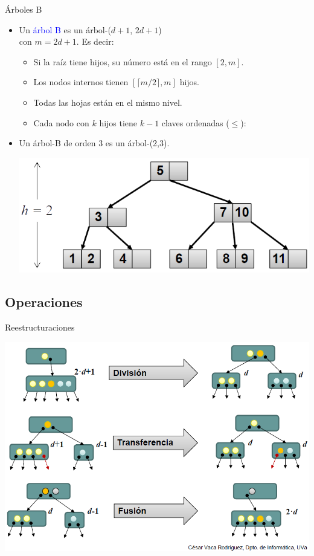 \documentclass[handout]{beamer} %
\newcommand{\blue}[1]{\textcolor{blue}{#1}}
\newcommand{\redb}[1]{{\color{red!70!black}{#1}}}
\begin{document}
\begin{frame}{Árboles B}
    \begin{itemize}
        \item<1-> Un \blue{árbol B} \redb{de orden $m$} es un árbol-($d+1$, $2d+1$)\\con $m=2d+1$. Es decir:
        \begin{itemize}
            \item Si la raíz tiene hijos, su número está en el rango $[2,m]$.
            \item Los nodos internos tienen $[\lceil m/2\rceil,m]$ hijos.
            \item Todas las hojas están en el mismo nivel.
            \item Cada nodo con $k$ hijos tiene $k-1$ claves ordenadas ($\leq$):
        \end{itemize}
        \item<2-> Un árbol-B de orden 3 es un árbol-(2,3).
        \begin{center}
            \includegraphics[width=.6\textwidth]{./image/cap3/(23)-tree}
        \end{center}
    \end{itemize}
\end{frame}

\subsection{Operaciones}

\begin{frame}{Reestructuraciones}
    \begin{center}
        \includegraphics[width=.98\textwidth]{./image/cap3/b-tree-reestructurar}
    \end{center}
\end{frame}
\end{document}
